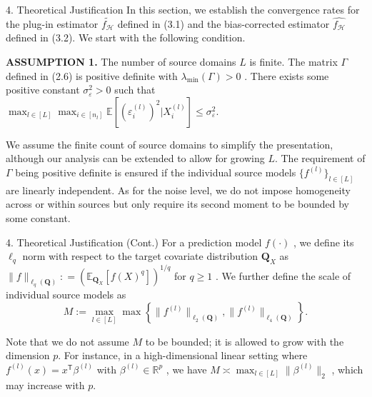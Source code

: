 \documentclass{beamer}
\begin{document}
\begin{frame}{4. Theoretical Justification}
    In this section, we establish the convergence rates for the plug-in estimator $\widetilde { f _ { \mathcal { H } } }$ defined in (3.1) and the bias-corrected estimator $\widehat { f _ { \mathcal { H } } }$ defined in (3.2). We start with the following condition.

    \textbf{ASSUMPTION 1.} The number of source domains $L$ is finite. The matrix $\Gamma$ defined in (2.6) is positive definite with $\lambda _ { \operatorname* { m i n } } ( \Gamma ) > 0$ . There exists some positive constant $\sigma _ { \varepsilon } ^ { 2 } > 0$ such that $\max_{l \in [ L ]} \max _ { i \in [ n _ { l } ] } \mathbb { E } [ ( \varepsilon _ { i } ^ { ( l ) } ) ^ { 2 } | X _ { i } ^ { ( l ) } ] \le \sigma _ { \varepsilon } ^ { 2 }$.
    
    We assume the finite count of source domains to simplify the presentation, although our analysis can be extended to allow for growing $L$. The requirement of $\Gamma$ being positive definite is ensured if the individual source models $\{ f ^ { ( l ) } \} _ { l \in [ L ] }$ are linearly independent. As for the noise level, we do not impose homogeneity across or within sources but only require its second moment to be bounded by some constant.
\end{frame}

\begin{frame}{4. Theoretical Justification (Cont.)}
    For a prediction model $f ( \cdot )$ , we define its $\ell _ { q }$ norm with respect to the target covariate distribution $\mathbf { Q } _ { X }$ as $\| f \| _ { \ell _ { q } ( \mathbf { Q } ) } : = ( \mathbb { E } _ { \mathbf { Q } _ { X } } [ f ( X ) ^ { q } ] ) ^ { 1 / q }$ for $q \geq 1$ . We further define the scale of individual source models as
    $$
    M := \max _ {l \in [ L ]} \max \left\{\| f ^ {(l)} \| _ {\ell_ {2} (\mathbf {Q})}, \| f ^ {(l)} \| _ {\ell_ {4} (\mathbf {Q})} \right\}. 
    $$
    
    Note that we do not assume $M$ to be bounded; it is allowed to grow with the dimension $p$. For instance, in a high-dimensional linear setting where $f ^ { ( l ) } ( x ) { \stackrel { } { = } } x ^ { \mathsf { T } } \beta ^ { ( l ) }$ with $\beta ^ { ( l ) } \in \mathbb { R } ^ { p }$ , we have $M \asymp \operatorname* { m a x } _ { l \in [ L ] } \| \beta ^ { ( l ) } \rVert _ { 2 }$ , which may increase with $p$.
\end{frame}
\end{document}
